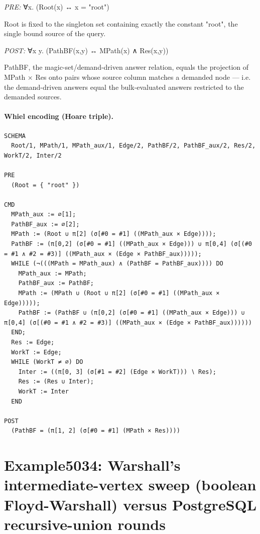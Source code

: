 \documentclass[10pt]{article}
\begin{document}
\textit{PRE:} ∀x. (Root(x) ↔ x = "root")\par Root is fixed to the singleton set containing exactly the constant "root", the single bound source of the query.

\textit{POST:} ∀x y. (PathBF(x,y) ↔ MPath(x) ∧ Res(x,y))\par PathBF, the magic-set/demand-driven answer relation, equals the projection of MPath × Res onto pairs whose source column matches a demanded node --- i.e. the demand-driven answers equal the bulk-evaluated answers restricted to the demanded sources.

\paragraph{Whiel encoding (Hoare triple).}

\begin{Verbatim}[fontsize=\scriptsize,breaklines=true,breakanywhere=true,frame=single,framesep=1.5mm]
SCHEMA
  Root/1, MPath/1, MPath_aux/1, Edge/2, PathBF/2, PathBF_aux/2, Res/2, WorkT/2, Inter/2

PRE
  (Root = { "root" })

CMD
  MPath_aux := ∅[1];
  PathBF_aux := ∅[2];
  MPath := (Root ∪ π[2] (σ[#0 = #1] ((MPath_aux × Edge))));
  PathBF := (π[0,2] (σ[#0 = #1] ((MPath_aux × Edge))) ∪ π[0,4] (σ[(#0 = #1 ∧ #2 = #3)] ((MPath_aux × (Edge × PathBF_aux)))));
  WHILE (¬(((MPath = MPath_aux) ∧ (PathBF = PathBF_aux)))) DO
    MPath_aux := MPath;
    PathBF_aux := PathBF;
    MPath := (MPath ∪ (Root ∪ π[2] (σ[#0 = #1] ((MPath_aux × Edge)))));
    PathBF := (PathBF ∪ (π[0,2] (σ[#0 = #1] ((MPath_aux × Edge))) ∪ π[0,4] (σ[(#0 = #1 ∧ #2 = #3)] ((MPath_aux × (Edge × PathBF_aux))))))
  END;
  Res := Edge;
  WorkT := Edge;
  WHILE (WorkT ≠ ∅) DO
    Inter := ((π[0, 3] (σ[#1 = #2] (Edge × WorkT))) ∖ Res);
    Res := (Res ∪ Inter);
    WorkT := Inter
  END

POST
  (PathBF = (π[1, 2] (σ[#0 = #1] (MPath × Res))))
\end{Verbatim}

\Needspace{0.45\textheight}

\section{Example5034: Warshall's intermediate-vertex sweep (boolean Floyd-Warshall) versus PostgreSQL recursive-union rounds}\label{case:Example5034}
\end{document}

